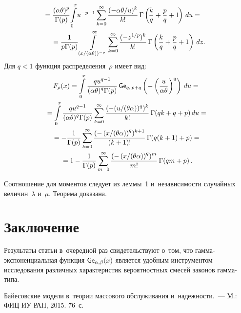 \begin{multicols}{2}
\noindent
\begin{multline*}
\hspace*{-9pt}\!\!{}=\fr{(\alpha \theta)^p}{\Gamma(p)}\!\int\limits_{0}^{x}\!u^{-p-1}
\sum\limits_{k=0}^\infty \fr{(-\alpha \theta/ u)^k }{k!}\, \Gamma
\left(\!\fr{k}{q}+\fr{p}{q}+1\!\right) \, du ={}\\
 {}= \fr{1}{ p\Gamma(p)} \int\limits_{(x/(\alpha \theta))^{-p}}^{\infty}
 \sum\limits_{k=0}^\infty \fr{(-z^{1/p})^k}{k!} \,\Gamma
 \left(\fr{k}{q}+\fr{p}{q}+1\right) \, dz.\hspace*{-4.34023pt}
 \end{multline*}
Для $q<1$ функция распределения~$\rho$ имеет вид:
\begin{multline*}
F_\rho(x) = \int\limits_{0}^{x}\displaystyle\frac{\displaystyle qu^{q-1}\mathstrut}{\displaystyle (\alpha \theta)^{q}\Gamma(p)\mathstrut}\,
{\sf Ge}_{q,\, p+q} \left(-\left(
\displaystyle\frac{\displaystyle u\mathstrut}{\displaystyle \alpha \theta\mathstrut}\right)^{q}\right) \,du ={}\\
{}=\int\limits_{0}^{x}\displaystyle\frac{\displaystyle qu^{q-1}\mathstrut}{\displaystyle (\alpha \theta)^{q}\Gamma(p)\mathstrut}
\sum\limits_{k=0}^\infty \displaystyle\frac{\displaystyle (-(u/(\theta \alpha))^q)^k\mathstrut}{\displaystyle k!\mathstrut}\, \Gamma(qk+q+p) \,du ={}\\
{}=-\displaystyle\frac{\displaystyle 1\mathstrut}{\displaystyle \Gamma(p)\mathstrut}\sum\limits_{k=0}^\infty 
\displaystyle\frac{\displaystyle \left(-\left(x/(\theta \alpha\right)\right)^{q})^{k+1} \mathstrut}{\displaystyle (k+1)!\mathstrut}\, \Gamma(q(k+1)+p)={}\\
{}=1-\displaystyle\frac{\displaystyle 1\mathstrut}{\displaystyle \Gamma(p)\mathstrut}\sum\limits_{m=0}^\infty 
\displaystyle\frac{\displaystyle \left(-\left(x/(\theta \alpha\right)\right)^{q})^m\mathstrut}{\displaystyle m!\mathstrut}\, \Gamma(qm+p)\,.
\end{multline*}

Соотношение для моментов следует из леммы~1 и~независимости случайных величин~$\lambda$ 
и~$\mu$. Теорема доказана.



\section{Заключение}

Результаты статьи в~очередной раз свидетельствуют о~том, 
что гам\-ма-экс\-по\-нен\-ци\-аль\-ная функция 
${\sf Ge}_{\alpha, \beta} (x)$ является удобным инструментом иссле\-до\-ва\-ния 
различных характеристик вероятностных смесей законов гам\-ма-типа.


{\small\frenchspacing
 {%
 \begin{thebibliography}{9}

Байесовские модели в~тео\-рии массового обслуживания и~надежности.~--- 
М.: ФИЦ ИУ РАН, 2015. 76~с.


\end{thebibliography}}}
\end{multicols}
